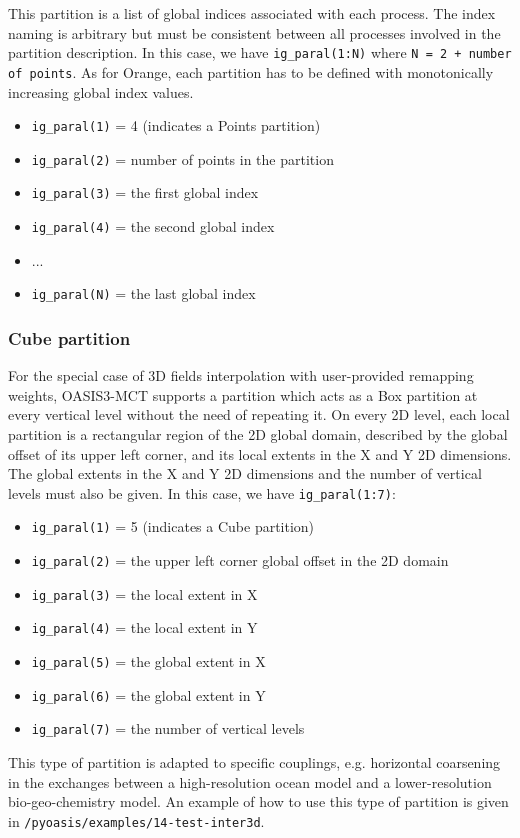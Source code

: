 This partition is a list of global indices associated with each
process.  The index naming
is arbitrary but must be consistent between all processes involved
in the partition description.  In
this case, we have {\tt ig\_paral(1:N)} where {\tt N = 2 + number of
  points}.
As for Orange, 
each partition has to be defined with monotonically increasing global index values. 

\begin{itemize}
\item {\tt ig\_paral(1)} = 4 (indicates a Points partition)
\item {\tt ig\_paral(2)} = number of points in the partition
\item {\tt ig\_paral(3)} = the first global index
\item {\tt ig\_paral(4)} = the second global index
\item ...
\item {\tt ig\_paral(N)} = the last global index
\end{itemize}

\subsubsection{Cube partition}
\label{Cube_partition}

For the special case of 3D fields interpolation with user-provided
remapping weights, OASIS3-MCT supports a partition which acts as
a Box partition at every vertical level without the need
of repeating it. On every
2D level, each local partition is a rectangular region of the 2D global
domain, described by the global offset of its upper left corner, and
its local extents in the X and Y 2D dimensions. The global extents in the
X and Y 2D dimensions and the number of vertical levels must also be
given. In this case, we have {\tt ig\_paral(1:7)}:
\begin{itemize} 
\item {\tt ig\_paral(1)} = 5 (indicates a Cube partition)
\item {\tt ig\_paral(2)} = the upper left corner global offset in the 2D domain
\item {\tt ig\_paral(3)} = the local extent in X
\item {\tt ig\_paral(4)} = the local extent in Y
\item {\tt ig\_paral(5)} = the global extent in X
\item {\tt ig\_paral(6)} = the global extent in Y
\item {\tt ig\_paral(7)} = the number of vertical  levels
\end{itemize}
This type of partition is adapted to specific
couplings, e.g. horizontal coarsening in the exchanges between a high-resolution
ocean model and a lower-resolution bio-geo-chemistry model.  An example of how to use this type of partition is given in  {\tt /pyoasis/examples/14-test-inter3d}. 

